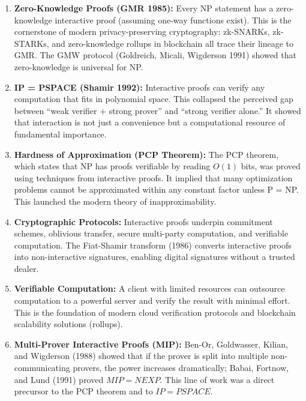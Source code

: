 \begin{enumerate}
\item \textbf{Zero-Knowledge Proofs (GMR 1985):} Every NP statement has a zero-knowledge interactive proof (assuming one-way functions exist). This is the cornerstone of modern privacy-preserving cryptography: zk-SNARKs, zk-STARKs, and zero-knowledge rollups in blockchain all trace their lineage to GMR. The GMW protocol (Goldreich, Micali, Wigderson 1991) showed that zero-knowledge is universal for NP.

\item \textbf{IP = PSPACE (Shamir 1992):} Interactive proofs can verify any computation that fits in polynomial space. This collapsed the perceived gap between ``weak verifier + strong prover'' and ``strong verifier alone.'' It showed that interaction is not just a convenience but a computational resource of fundamental importance.

\item \textbf{Hardness of Approximation (PCP Theorem):} The PCP theorem, which states that NP has proofs verifiable by reading $O(1)$ bits, was proved using techniques from interactive proofs. It implied that many optimization problems cannot be approximated within any constant factor unless P = NP. This launched the modern theory of inapproximability.

\item \textbf{Cryptographic Protocols:} Interactive proofs underpin commitment schemes, oblivious transfer, secure multi-party computation, and verifiable computation. The Fiat-Shamir transform (1986) converts interactive proofs into non-interactive signatures, enabling digital signatures without a trusted dealer.

\item \textbf{Verifiable Computation:} A client with limited resources can outsource computation to a powerful server and verify the result with minimal effort. This is the foundation of modern cloud verification protocols and blockchain scalability solutions (rollups).

\item \textbf{Multi-Prover Interactive Proofs (MIP):} Ben-Or, Goldwasser, Kilian, and Wigderson (1988) showed that if the prover is split into multiple non-communicating provers, the power increases dramatically; Babai, Fortnow, and Lund (1991) proved $MIP = NEXP$. This line of work was a direct precursor to the PCP theorem and to $IP = PSPACE$.
\end{enumerate}

